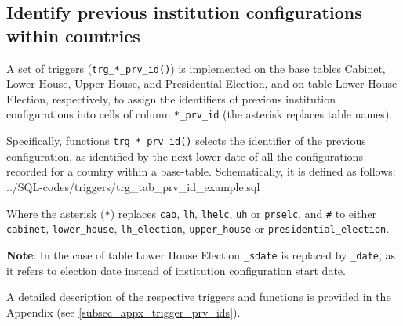 \subsection{Identify previous institution configurations within countries}\label{subsec_trg_prv_ids}

A set of triggers (\texttt{trg\_*\_prv\_id()}) is implemented on the base tables Cabinet, Lower House, Upper House, and Presidential Election, and on table Lower House Election, respectively, to assign the identifiers of previous institution configurations into cells of column \texttt{*\_prv\_id} (the asterisk replaces table names).

Specifically, functions \texttt{trg\_*\_prv\_id()} selects the identifier of the previous configuration, as identified by the next lower date of all the configurations recorded for a country within a base-table.
Schematically, it is defined as follows:
%
{../SQL-codes/triggers/trg_tab_prv_id_example.sql}

Where the asterisk (\texttt{*}) replaces \texttt{cab}, \texttt{lh}, \texttt{lhelc}, \texttt{uh} or \texttt{prselc}, and \texttt{\#} to either \texttt{cabinet}, \texttt{lower\_house}, \texttt{lh\_election}, \texttt{upper\_house} or \texttt{presidential\_election}.

{\bf Note}: In the case of table Lower House Election \texttt{\_sdate} is replaced by \texttt{\_date}, as it refers to election date instead of institution configuration start date.

A detailed description of the respective triggers and functions is provided in the Appendix (see \ref{subsec_appx_trigger_prv_ids}).



